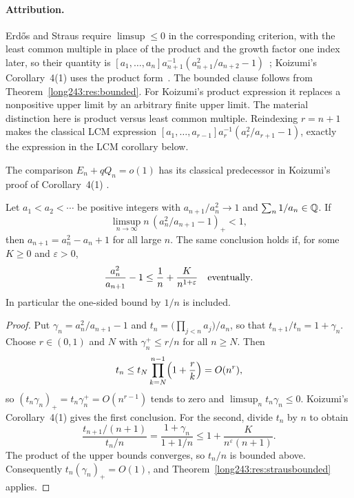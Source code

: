\documentclass[11pt]{article}
\begin{document}
\paragraph{Attribution.}
Erd\H{o}s and Straus require $\limsup\le0$ in the corresponding criterion, with
the least common multiple in place of the product and the growth factor one
index later, so their quantity is
$[a_1,\ldots,a_n]a_{n+1}^{-1}(a_{n+1}^{2}/a_{n+2}-1)$~\cite[Theorem~3,
p.~132]{erdosstraus1964}; Koizumi's Corollary~4(1) uses the product
form~\cite[Cor.~4(1), pp.~14--15]{koizumi2025}.  The bounded clause follows from
Theorem~\ref{long243:res:bounded}. For Koizumi's product expression it
replaces a nonpositive upper limit by an arbitrary finite upper limit.
The material distinction here is product versus least common multiple.
Reindexing $r=n+1$ makes the classical LCM expression
$[a_1,\ldots,a_{r-1}]a_r^{-1}(a_r^2/a_{r+1}-1)$, exactly the expression
in the LCM corollary below.

The comparison $E_n+qQ_n=o(1)$ has its classical predecessor in
Koizumi's proof of Corollary~4(1) \cite[(11)--(12), p.~15]{koizumi2025}.

\begin{corollary}\label{long243:res:onethreshold}
Let $a_1<a_2<\cdots$ be positive integers with $a_{n+1}/a_n^2\to1$
and $\sum_n1/a_n\in\mathbb{Q}$. If
\[
 \limsup_{n\to\infty} n\,(a_n^2/a_{n+1}-1)_+<1,
\]
then $a_{n+1}=a_n^2-a_n+1$ for all large $n$. The same conclusion holds if, for some $K\ge0$ and $\varepsilon>0$,
\[
 \frac{a_n^2}{a_{n+1}}-1\le\frac1n+\frac{K}{n^{1+\varepsilon}}
 \quad\hbox{eventually}.
\]
In particular the one-sided bound by $1/n$ is included.
\end{corollary}

\begin{proof}
Put $\gamma_n=a_n^2/a_{n+1}-1$ and $t_n=\bigl(\prod_{j<n}a_j\bigr)/a_n$, so
that $t_{n+1}/t_n=1+\gamma_n$.  Choose $r\in(0,1)$ and $N$ with
$\gamma_n^{+}\le r/n$ for all $n\ge N$.  Then
\[
 t_n\le t_N\prod_{k=N}^{n-1}\Bigl(1+\frac rk\Bigr)=O(n^{r}),
\]
so $(t_n\gamma_n)_+=t_n\gamma_n^{+}=O(n^{r-1})$ tends to zero and
$\limsup_nt_n\gamma_n\le0$.  Koizumi's Corollary~4(1)
\cite[pp.~14--15]{koizumi2025} gives the first conclusion.
For the second, divide $t_n$ by $n$ to obtain
\[
 \frac{t_{n+1}/(n+1)}{t_n/n}
 =\frac{1+\gamma_n}{1+1/n}
 \le 1+\frac{K}{n^\varepsilon(n+1)}.
\]
The product of the upper bounds converges, so $t_n/n$ is bounded above.
Consequently $t_n(\gamma_n)_+=O(1)$, and
Theorem~\ref{long243:res:strausbounded} applies.
\end{proof}
\end{document}
